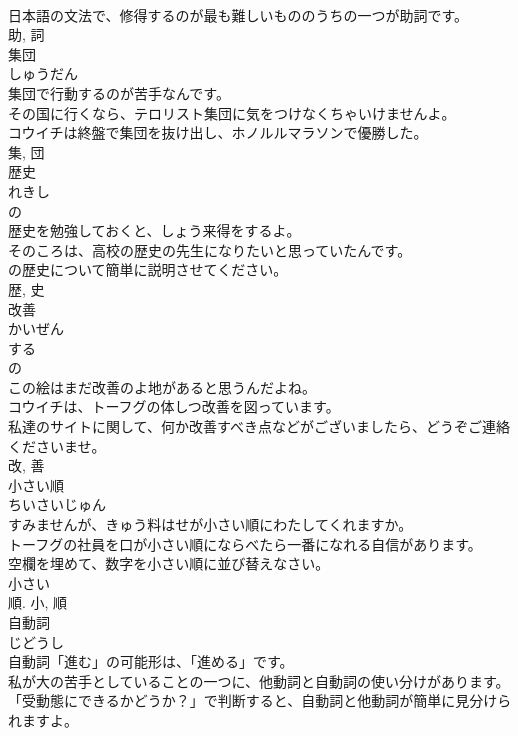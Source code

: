 \documentclass[8pt]{extreport}
\begin{document}
\begin{CJK}{UTF8}{min}
\\	日本語の文法で、修得するのが最も難しいもののうちの一つが助詞です。	
\\	助, 詞	
\\	集団	
\\	しゅうだん	
\\	集団で行動するのが苦手なんです。	
\\	その国に行くなら、テロリスト集団に気をつけなくちゃいけませんよ。	
\\	コウイチは終盤で集団を抜け出し、ホノルルマラソンで優勝した。	
\\	集, 団	
\\	歴史	
\\	れきし	
\\	の 
\\	歴史を勉強しておくと、しょう来得をするよ。	
\\	そのころは、高校の歴史の先生になりたいと思っていたんです。	
\\	の歴史について簡単に説明させてください。	
\\	歴, 史	
\\	改善	
\\	かいぜん	
\\	する 
\\	の 
\\	この絵はまだ改善のよ地があると思うんだよね。	
\\	コウイチは、トーフグの体しつ改善を図っています。	
\\	私達のサイトに関して、何か改善すべき点などがございましたら、どうぞご連絡くださいませ。	
\\	改, 善	
\\	小さい順	
\\	ちいさいじゅん	
\\	すみませんが、きゅう料はせが小さい順にわたしてくれますか。	
\\	トーフグの社員を口が小さい順にならべたら一番になれる自信があります。	
\\	空欄を埋めて、数字を小さい順に並び替えなさい。	
\\	小さい 
\\	順.	小, 順	
\\	自動詞	
\\	じどうし	
\\	自動詞「進む」の可能形は、「進める」です。	
\\	私が大の苦手としていることの一つに、他動詞と自動詞の使い分けがあります。	
\\	「受動態にできるかどうか？」で判断すると、自動詞と他動詞が簡単に見分けられますよ。	

\end{CJK}
\end{document}

